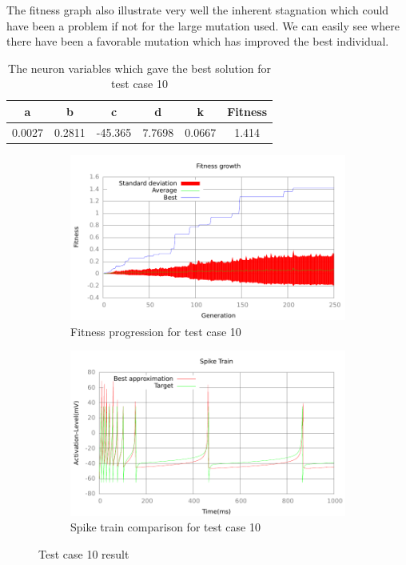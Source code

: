 The fitness graph also illustrate very well the inherent stagnation which could
have been a problem if not for the large mutation used. We can easily see where
there have been a favorable mutation which has improved the best individual.
\begin{table}
	\begin{tabular}{c c c c c c}
		a & b & c & d & k & Fitness \\
		\hline
		0.0027 & 0.2811 & -45.365 & 7.7698 & 0.0667 & 1.414
	\end{tabular}
	\caption{The neuron variables which gave the best solution for test case
	10}
\end{table}
\begin{figure}[h]
	\centering
	\begin{subfigure}[b]{0.5\textwidth}
		\includegraphics[width=\textwidth]{../output/stdm_izzy_4_fitness.pdf}
		\caption{Fitness progression for test case 10}
		\label{fig:fitness-test-case-10}
	\end{subfigure}%
	\begin{subfigure}[b]{0.5\textwidth}
		\includegraphics[width=\textwidth]{../output/stdm_izzy_4_spike.pdf}
		\caption{Spike train comparison for test case 10}
		\label{fig:spike-test-case-10}
	\end{subfigure}
	\caption{Test case 10 result}
\end{figure}

